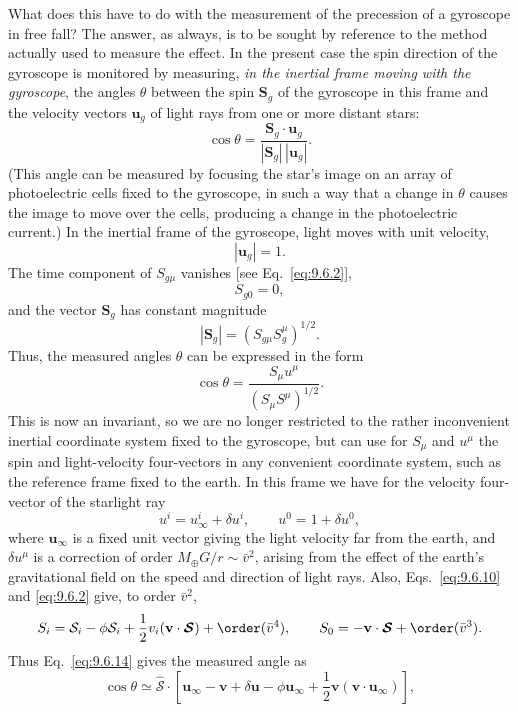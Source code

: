 What does this have to do with the measurement of the precession of a
gyroscope in free fall? The answer, as always, is to be sought by reference
to the method actually used to measure the effect. In the present case the
spin direction of the gyroscope is monitored by measuring, \emph{in the
inertial frame moving with the gyroscope}, the angles \(\theta\) between
the spin \(\mathbf S_g\) of the gyroscope in this frame and the velocity
vectors \(\mathbf u_g\) of light rays from one or more distant stars:
\begin{equation}
  \cos\theta
  =
  \frac{\mathbf S_g\cdot\mathbf u_g}
       {|\mathbf S_g|\,|\mathbf u_g|}.
  \tag{9.6.13}\label{eq:9.6.13}
\end{equation}
(This angle can be measured by focusing the star's image on an array of
photoelectric cells fixed to the gyroscope, in such a way that a change in
\(\theta\) causes the image to move over the cells, producing a change in
the photoelectric current.) In the inertial frame of the gyroscope, light
moves with unit velocity,
\[
  |\mathbf u_g|=1.
\]
The time component of \(S_{g\mu}\) vanishes
[see Eq.~\eqref{eq:9.6.2}],
\[
  S_{g0}=0,
\]
and the vector \(\mathbf S_g\) has constant magnitude
\[
  |\mathbf S_g|=(S_{g\mu}S_g^\mu)^{1/2}.
\]
Thus, the measured angles \(\theta\) can be expressed in the form
\begin{equation}
  \cos\theta
  =
  \frac{S_\mu u^\mu}{(S_\mu S^\mu)^{1/2}}.
  \tag{9.6.14}\label{eq:9.6.14}
\end{equation}
This is now an invariant, so we are no longer restricted to the rather
inconvenient inertial coordinate system fixed to the gyroscope, but can use
for \(S_\mu\) and \(u^\mu\) the spin and light-velocity four-vectors in any
convenient coordinate system, such as the reference frame fixed to the
earth. In this frame we have for the velocity four-vector of the starlight
ray
\[
  u^i=u_\infty^i+\delta u^i,
  \qquad
  u^0=1+\delta u^0,
\]
where \(\mathbf u_\infty\) is a fixed unit vector giving the light velocity
far from the earth, and \(\delta u^\mu\) is a correction of order
\(M_\oplus G/r\sim\bar v^2\), arising from the effect of the earth's
gravitational field on the speed and direction of light rays. Also,
Eqs.~\eqref{eq:9.6.10} and \eqref{eq:9.6.2} give, to order \(\bar v^2\),
\[
  S_i
  =
  \mathcal S_i-\phi\mathcal S_i
  +\frac12v_i(\mathbf v\cdot\boldsymbol{\mathcal S})
  +\order(\bar v^4),
  \qquad
  S_0=-\mathbf v\cdot\boldsymbol{\mathcal S}+\order(\bar v^3).
\]
Thus Eq.~\eqref{eq:9.6.14} gives the measured angle as
\begin{equation}
  \cos\theta
  \simeq
  \widehat{\boldsymbol{\mathcal S}}\cdot
  \left[
    \mathbf u_\infty-\mathbf v+\delta\mathbf u
    -\phi\mathbf u_\infty
    +\frac12\mathbf v(\mathbf v\cdot\mathbf u_\infty)
  \right],
  \tag{9.6.15}\label{eq:9.6.15}
\end{equation}
